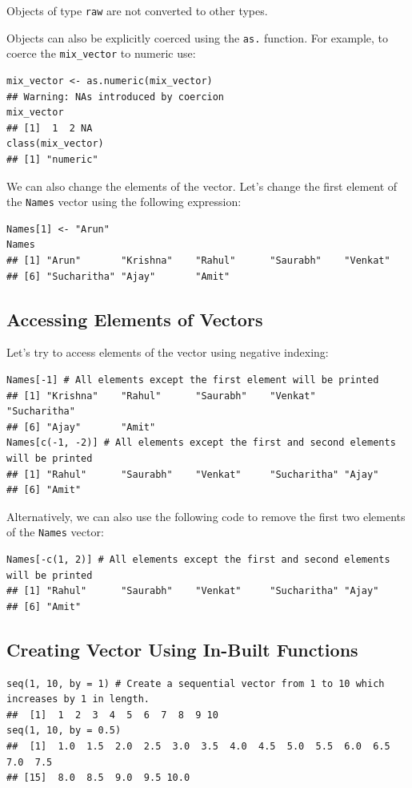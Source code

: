 \documentclass[12pt]{book}
\begin{document}
Objects of type \texttt{raw} are not converted to other types.

Objects can also be explicitly coerced using the \texttt{as.} function. For example, to coerce the \texttt{mix\_vector} to numeric use:
\begin{verbatim}
mix_vector <- as.numeric(mix_vector)
## Warning: NAs introduced by coercion
mix_vector
## [1]  1  2 NA
class(mix_vector)
## [1] "numeric"
\end{verbatim}

We can also change the elements of the vector. Let’s change the first element of the \texttt{Names} vector using the following expression:
\begin{verbatim}
Names[1] <- "Arun"
Names
## [1] "Arun"       "Krishna"    "Rahul"      "Saurabh"    "Venkat"    
## [6] "Sucharitha" "Ajay"       "Amit"
\end{verbatim}

\subsection{Accessing Elements of Vectors}
Let’s try to access elements of the vector using negative indexing:
\begin{verbatim}
Names[-1] # All elements except the first element will be printed
## [1] "Krishna"    "Rahul"      "Saurabh"    "Venkat"     "Sucharitha"
## [6] "Ajay"       "Amit"
Names[c(-1, -2)] # All elements except the first and second elements will be printed
## [1] "Rahul"      "Saurabh"    "Venkat"     "Sucharitha" "Ajay"      
## [6] "Amit"
\end{verbatim}

Alternatively, we can also use the following code to remove the first two elements of the \texttt{Names} vector:
\begin{verbatim}
Names[-c(1, 2)] # All elements except the first and second elements will be printed
## [1] "Rahul"      "Saurabh"    "Venkat"     "Sucharitha" "Ajay"      
## [6] "Amit"
\end{verbatim}

\subsection{Creating Vector Using In-Built Functions}
\begin{verbatim}
seq(1, 10, by = 1) # Create a sequential vector from 1 to 10 which increases by 1 in length.
##  [1]  1  2  3  4  5  6  7  8  9 10
seq(1, 10, by = 0.5)
##  [1]  1.0  1.5  2.0  2.5  3.0  3.5  4.0  4.5  5.0  5.5  6.0  6.5  7.0  7.5
## [15]  8.0  8.5  9.0  9.5 10.0
\end{verbatim}
\end{document}
